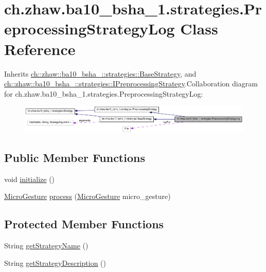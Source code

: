 \hypertarget{classch_1_1zhaw_1_1ba10__bsha__1_1_1strategies_1_1PreprocessingStrategyLog}{
\section{ch.zhaw.ba10\_\-bsha\_\-1.strategies.PreprocessingStrategyLog Class Reference}
\label{classch_1_1zhaw_1_1ba10__bsha__1_1_1strategies_1_1PreprocessingStrategyLog}
}


Inherits \hyperlink{classch_1_1zhaw_1_1ba10__bsha__1_1_1strategies_1_1BaseStrategy}{ch::zhaw::ba10\_\-bsha\_::strategies::BaseStrategy}, and \hyperlink{interfacech_1_1zhaw_1_1ba10__bsha__1_1_1strategies_1_1IPreprocessingStrategy}{ch::zhaw::ba10\_\-bsha\_::strategies::IPreprocessingStrategy}.Collaboration diagram for ch.zhaw.ba10\_\-bsha\_\-1.strategies.PreprocessingStrategyLog:\nopagebreak
\begin{figure}[H]
\begin{center}
\leavevmode
\includegraphics[width=400pt]{classch_1_1zhaw_1_1ba10__bsha__1_1_1strategies_1_1PreprocessingStrategyLog__coll__graph}
\end{center}
\end{figure}
\subsection*{Public Member Functions}
\begin{DoxyCompactItemize}
\item 
void \hyperlink{classch_1_1zhaw_1_1ba10__bsha__1_1_1strategies_1_1PreprocessingStrategyLog_acac70ca9f34f19eb4f6a762895b2ffec}{initialize} ()
\item 
\hyperlink{classch_1_1zhaw_1_1ba10__bsha__1_1_1service_1_1MicroGesture}{MicroGesture} \hyperlink{classch_1_1zhaw_1_1ba10__bsha__1_1_1strategies_1_1PreprocessingStrategyLog_a4a22fc4b981ca9898e730579f93744fe}{process} (\hyperlink{classch_1_1zhaw_1_1ba10__bsha__1_1_1service_1_1MicroGesture}{MicroGesture} micro\_\-gesture)
\end{DoxyCompactItemize}
\subsection*{Protected Member Functions}
\begin{DoxyCompactItemize}
\item 
String \hyperlink{classch_1_1zhaw_1_1ba10__bsha__1_1_1strategies_1_1PreprocessingStrategyLog_a278aa48e1f1dd64d130fe528d879c632}{getStrategyName} ()
\item 
String \hyperlink{classch_1_1zhaw_1_1ba10__bsha__1_1_1strategies_1_1PreprocessingStrategyLog_a9dc4e3fe302e8e318c68e3f2257a8979}{getStrategyDescription} ()
\end{DoxyCompactItemize}
